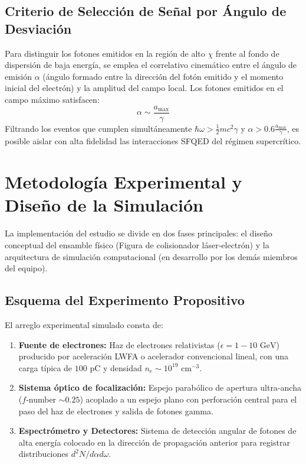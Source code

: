\documentclass[twocolumn, 12pt]{article}
\begin{document}
\subsection{Criterio de Selección de Señal por Ángulo de Desviación}
Para distinguir los fotones emitidos en la región de alto $\chi$ frente al fondo de dispersión de baja energía, se emplea el correlativo cinemático entre el ángulo de emisión $\alpha$ (ángulo formado entre la dirección del fotón emitido y el momento inicial del electrón) y la amplitud del campo local. Los fotones emitidos en el campo máximo satisfacen:
\begin{equation}
\alpha \sim \frac{a_{\text{max}}}{\gamma}
\end{equation}
Filtrando los eventos que cumplen simultáneamente $\hbar \omega > \frac{1}{2} m c^2 \gamma$ y $\alpha > 0.6 \frac{a_{\text{max}}}{\gamma}$, es posible aislar con alta fidelidad las interacciones SFQED del régimen supercrítico.

\section{Metodología Experimental y Diseño de la Simulación}

La implementación del estudio se divide en dos fases principales: el diseño conceptual del ensamble físico (Figura de colisionador láser-electrón) y la arquitectura de simulación computacional (en desarrollo por los demás miembros del equipo).

\subsection{Esquema del Experimento Propositivo}
El arreglo experimental simulado consta de:
\begin{enumerate}
    \item \textbf{Fuente de electrones:} Haz de electrones relativistas ($\epsilon = 1 - 10 \text{ GeV}$) producido por aceleración LWFA o acelerador convencional lineal, con una carga típica de $100 \text{ pC}$ y densidad $n_e \sim 10^{19} \text{ cm}^{-3}$.
    \item \textbf{Sistema óptico de focalización:} Espejo parabólico de apertura ultra-ancha ($f$-number $\sim 0.25$) acoplado a un espejo plano con perforación central para el paso del haz de electrones y salida de fotones gamma.
    \item \textbf{Espectrómetro y Detectores:} Sistema de detección angular de fotones de alta energía colocado en la dirección de propagación anterior para registrar distribuciones $d^2 N / d\alpha d\omega$.
\end{enumerate}
\end{document}
